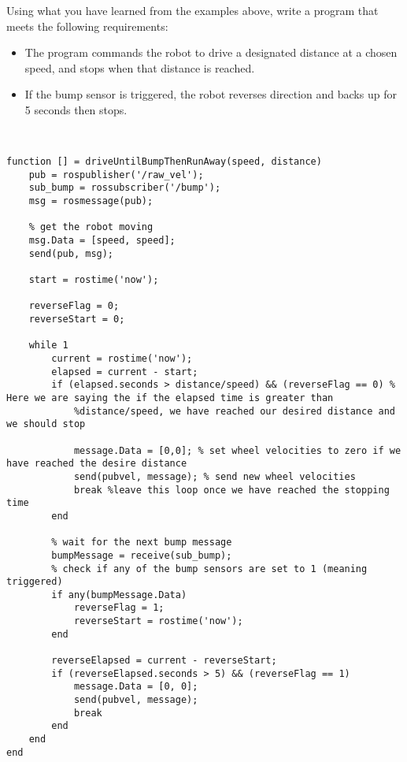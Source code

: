 Using what you have learned from the examples above, write a program that meets the following requirements:

\begin{itemize}
    \item The program commands the robot to drive a designated distance at a chosen speed, and stops when that distance is reached.
    \item If the bump sensor is triggered, the robot reverses direction and backs up for 5 seconds then stops.
\end{itemize}

\begin{solution} \
\begin{lstlisting}
function [] = driveUntilBumpThenRunAway(speed, distance)
    pub = rospublisher('/raw_vel');
    sub_bump = rossubscriber('/bump');
    msg = rosmessage(pub);

    % get the robot moving
    msg.Data = [speed, speed];
    send(pub, msg);

    start = rostime('now');
    
    reverseFlag = 0;
    reverseStart = 0;
    
    while 1
        current = rostime('now');
        elapsed = current - start;
        if (elapsed.seconds > distance/speed) && (reverseFlag == 0) % Here we are saying the if the elapsed time is greater than 
            %distance/speed, we have reached our desired distance and we should stop

            message.Data = [0,0]; % set wheel velocities to zero if we have reached the desire distance
            send(pubvel, message); % send new wheel velocities
            break %leave this loop once we have reached the stopping time
        end
        
        % wait for the next bump message
        bumpMessage = receive(sub_bump);
        % check if any of the bump sensors are set to 1 (meaning triggered)
        if any(bumpMessage.Data)
            reverseFlag = 1;
            reverseStart = rostime('now');
        end
        
        reverseElapsed = current - reverseStart;
        if (reverseElapsed.seconds > 5) && (reverseFlag == 1)
            message.Data = [0, 0];
            send(pubvel, message);
            break
        end
    end
end
\end{lstlisting}
\end{solution}